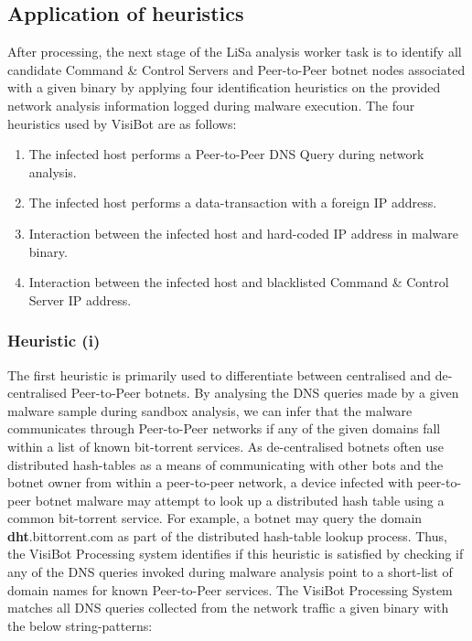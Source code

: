 \subsection{Application of heuristics}

After processing, the next stage of the LiSa analysis worker task is to identify all candidate Command \& Control Servers and Peer-to-Peer botnet nodes associated with a given binary by applying four identification heuristics on the provided network analysis information logged during malware execution. The four heuristics used by VisiBot are as follows:

\begin{enumerate}[i]
    \item The infected host performs a Peer-to-Peer DNS Query during network analysis.
    \item The infected host performs a data-transaction with a foreign IP address.
    \item Interaction between the infected host and hard-coded IP address in malware binary.
    \item Interaction between the infected host and blacklisted Command \& Control Server IP address.
\end{enumerate}

\subsubsection{Heuristic (i)}

The first heuristic is primarily used to differentiate between centralised and de-centralised Peer-to-Peer botnets. By analysing the DNS queries made by a given malware sample during sandbox analysis, we can infer that the malware communicates through Peer-to-Peer networks if any of the given domains fall within a list of known bit-torrent services. As de-centralised botnets often use distributed hash-tables as a means of communicating with other bots and the botnet owner from within a peer-to-peer network, a device infected with peer-to-peer botnet malware may attempt to look up a distributed hash table using a common bit-torrent service. For example, a botnet may query the domain \textbf{dht}.bittorrent.com as part of the distributed hash-table lookup process. Thus, the VisiBot Processing system identifies if this heuristic is satisfied by checking if any of the DNS queries invoked during malware analysis point to a short-list of domain names for known Peer-to-Peer services. The VisiBot Processing System matches all DNS queries collected from the network traffic a given binary with the below string-patterns:

